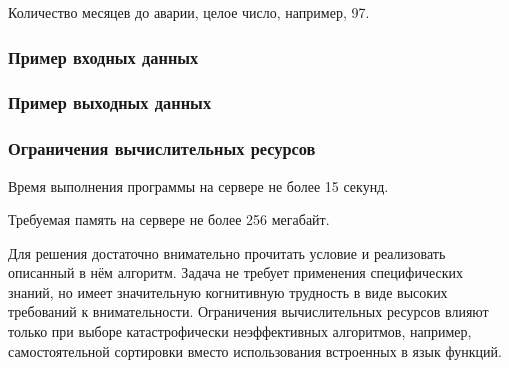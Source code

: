 \outputfmtSection

Количество месяцев до аварии, целое число, например, 97.

\subsubsection*{Пример входных данных}

\noindent[91.05173216589283, 346.59744306410516, 79.340611380049, 6.301441137920902, \\ 
34.63321051774173, 283.7442062865518, 462.85639563921933, 18.35969426088177, \\
114.42284118915013, 348.2511151684352, $\cdots$ ]

\subsubsection*{Пример выходных данных}


\subsubsection*{Ограничения вычислительных ресурсов}

Время выполнения программы на сервере не более 15 секунд.

Требуемая память на сервере не более 256 мегабайт.

\solutionSection

Для решения достаточно внимательно прочитать условие и реализовать описанный в нём алгоритм. Задача не требует применения специфических знаний, но имеет значительную когнитивную трудность в виде высоких требований к внимательности. Ограничения вычислительных ресурсов влияют только при выборе катастрофически неэффективных алгоритмов, например, самостоятельной сортировки вместо использования встроенных в язык функций.


